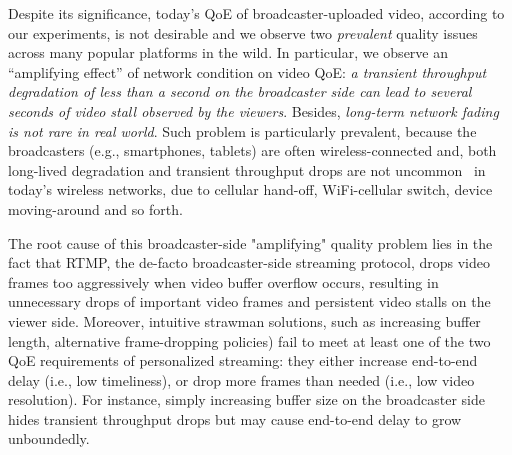%
%

Despite its significance, today's QoE of broadcaster-uploaded video,
according to our experiments, is not desirable and we observe two {\em prevalent}
quality issues across many popular platforms in the wild.
In particular, we observe an ``amplifying effect'' of network
condition on video QoE: {\em a transient throughput  degradation
of less than a second on the broadcaster side can lead to
several seconds of video stall observed by the viewers}. Besides, {\em long-term network fading is not rare in real world}.
Such problem is particularly prevalent, because the broadcasters
(e.g., smartphones, tablets) are often wireless-connected and, both
long-lived degradation and transient throughput drops are not
uncommon~\cite{some-paper-to-show-this}  in today's wireless networks,
due to cellular hand-off, WiFi-cellular
switch, device moving-around and so forth.


The root cause of this broadcaster-side "amplifying" quality problem
lies in the fact that RTMP, the de-facto broadcaster-side streaming protocol,
drops video frames too aggressively when video buffer overflow
occurs, resulting in unnecessary drops of important video frames and
persistent video stalls on the viewer side.
Moreover, intuitive strawman solutions, such as increasing
buffer length, alternative frame-dropping policies) fail to meet at least one
of the two QoE requirements of personalized streaming:
they either increase end-to-end delay (i.e., low timeliness), or drop more
frames than needed (i.e., low video resolution).
For instance, simply increasing buffer size on the broadcaster
side hides transient throughput drops but may cause end-to-end
delay to grow unboundedly.

